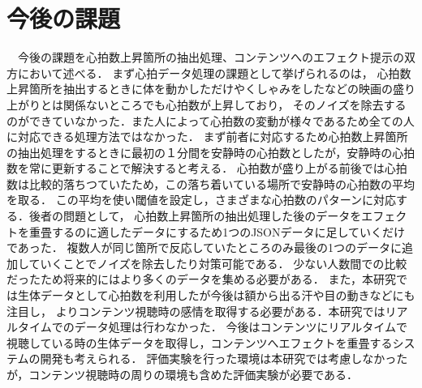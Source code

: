 \section{今後の課題}
　今後の課題を心拍数上昇箇所の抽出処理、コンテンツへのエフェクト提示の双方において述べる．
まず心拍データ処理の課題として挙げられるのは，
心拍数上昇箇所を抽出するときに体を動かしただけやくしゃみをしたなどの映画の盛り上がりとは関係ないところでも心拍数が上昇しており，
そのノイズを除去するのができていなかった．また人によって心拍数の変動が様々であるため全ての人に対応できる処理方法ではなかった．
まず前者に対応するため心拍数上昇箇所の抽出処理をするときに最初の１分間を安静時の心拍数としたが，安静時の心拍数を常に更新することで解決すると考える．
心拍数が盛り上がる前後では心拍数は比較的落ちつていたため，この落ち着いている場所で安静時の心拍数の平均を取る．
この平均を使い閾値を設定し，さまざまな心拍数のパターンに対応する．後者の問題として，
心拍数上昇箇所の抽出処理した後のデータをエフェクトを重畳するのに適したデータにするため1つのJSONデータに足していくだけであった．
複数人が同じ箇所で反応していたところのみ最後の1つのデータに追加していくことでノイズを除去したり対策可能である．
少ない人数間での比較だったため将来的にはより多くのデータを集める必要がある．
また，本研究では生体データとして心拍数を利用したが今後は額から出る汗や目の動きなどにも注目し，
よりコンテンツ視聴時の感情を取得する必要がある．本研究ではリアルタイムでのデータ処理は行わなかった．
今後はコンテンツにリアルタイムで視聴している時の生体データを取得し，コンテンツへエフェクトを重畳するシステムの開発も考えられる．
評価実験を行った環境は本研究では考慮しなかったが，コンテンツ視聴時の周りの環境も含めた評価実験が必要である．

